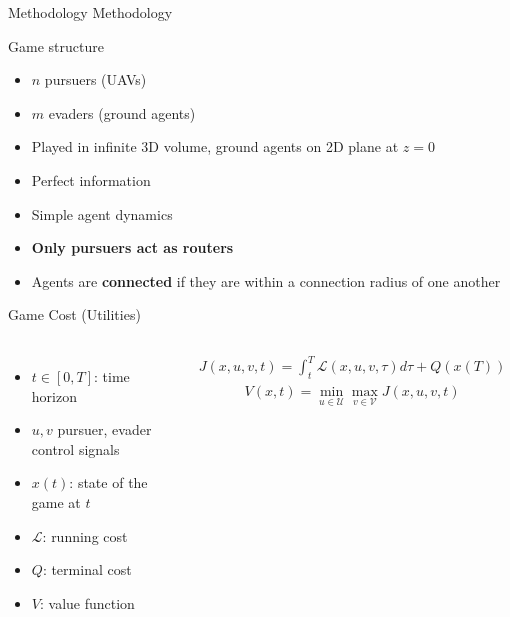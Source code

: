 \begin{frame}{Methodology}
    \huge
    \centering
    Methodology
\end{frame}

\begin{frame}{Game structure}
    \begin{itemize}
        \item $n$ pursuers (UAVs)
        \item $m$ evaders (ground agents)
        \item Played in infinite 3D volume, ground agents on 2D plane at $z = 0$
        \item Perfect information
        \item Simple agent dynamics
        \item \textbf{Only pursuers act as routers}
        \item Agents are \textbf{connected} if they are within a connection radius of one
              another
    \end{itemize}
\end{frame}

\begin{frame}{Game Cost (Utilities)}
    \begin{columns}
        \begin{itemize}
            \item $t \in [0, T]$: time horizon
            \item $u, v$ pursuer, evader control signals
            \item $x(t)$: state of the game at $t$
            \item $\mathcal{L}$: running cost
            \item $Q$: terminal cost
            \item $V$: value function
        \end{itemize}
        \begin{align*}
            J(x, u, v, t) = \int_{t}^T \mathcal{L}(x, u, v, \tau) d\tau + Q(x(T))
        \end{align*}
        \begin{align*}
            V(x, t) = \min_{u \in \mathcal{U}}\max_{v \in \mathcal{V}} J(x, u, v, t)
        \end{align*}
    \end{columns}
\end{frame}

